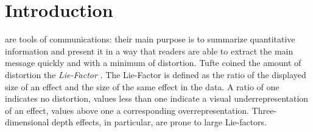 \section{Introduction}
%
%



% 
% 
% 
% 
 are tools of communications: their main purpose is  to summarize quantitative information and present it in a way that readers are able to extract the main message quickly and with a minimum of distortion. Tufte  coined the amount of distortion the \emph{Lie-Factor} \citep[p. 57--69]{tufte}. The Lie-Factor is defined as the ratio of the displayed size of an effect and the size of the same effect in the data. A ratio of one indicates no distortion, values less than one indicate a visual underrepresentation of an effect, values above one a corresponding overrepresentation. Three-dimensional depth effects, in particular, are prone to large Lie-factors.

